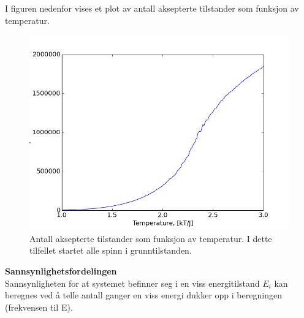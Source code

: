 \documentclass[11pt,a4paper]{article}
\begin{document}
I figuren nedenfor vises et plot av antall aksepterte tilstander som funksjon av temperatur.

\FloatBarrier
\begin{figure}[!ht]
 \centering
 \includegraphics[scale=0.4]{4cMCCe4upAcceptvsT.png}
 \caption{Antall aksepterte tilstander som funksjon av temperatur. I dette tilfellet startet alle spinn i grunntilstanden.}
 \label{aksept}
 \end{figure}
 \FloatBarrier

\textbf{Sannsynlighetsfordelingen}\\
Sannsynligheten for at systemet befinner seg i en viss energitilstand $E_i$ kan beregnes ved å telle antall ganger en viss energi dukker opp i beregningen (frekvensen til E). 
\end{document}

